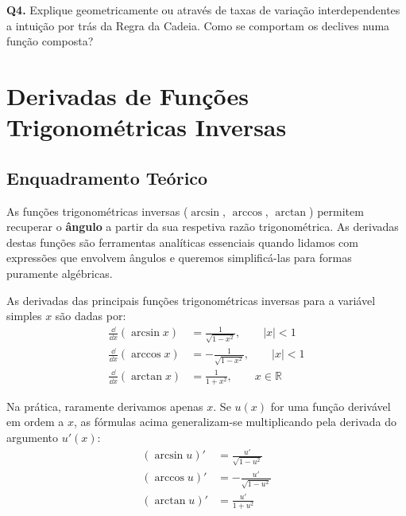 \begin{oralbox}
  \textbf{Q4.} Explique geometricamente ou através de taxas de variação interdependentes a intuição por trás da Regra da Cadeia. Como se comportam os declives numa função composta?
\end{oralbox}



\section{Derivadas de Funções Trigonométricas Inversas}

\subsection{Enquadramento Teórico}

\begin{notebox}[title={Intuição Essencial}]
  As funções trigonométricas inversas ($\arcsin$, $\arccos$, $\arctan$) permitem recuperar o \textbf{ângulo} a partir da sua respetiva razão trigonométrica. As derivadas destas funções são ferramentas analíticas essenciais quando lidamos com expressões que envolvem ângulos e queremos simplificá-las para formas puramente algébricas.
\end{notebox}

\begin{defbox}[title={Derivadas Fundamentais}]
  As derivadas das principais funções trigonométricas inversas para a variável simples $x$ são dadas por:
  \begin{align*}
      \frac{\dd}{\dd x} (\arcsin x) &= \frac{1}{\sqrt{1-x^2}}, \qquad |x| < 1 \\[1ex]
      \frac{\dd}{\dd x} (\arccos x) &= -\frac{1}{\sqrt{1-x^2}}, \qquad |x| < 1 \\[1ex]
      \frac{\dd}{\dd x} (\arctan x) &= \frac{1}{1+x^2}, \qquad x \in \mathbb{R}
  \end{align*}
\end{defbox}

\begin{defbox}[title={Generalização com a Regra da Cadeia}]
  Na prática, raramente derivamos apenas $x$. Se $u(x)$ for uma função derivável em ordem a $x$, as fórmulas acima generalizam-se multiplicando pela derivada do argumento $u'(x)$:
  \begin{align*}
      (\arcsin u)' &= \frac{u'}{\sqrt{1-u^2}} \\[1ex]
      (\arccos u)' &= -\frac{u'}{\sqrt{1-u^2}} \\[1ex]
      (\arctan u)' &= \frac{u'}{1+u^2}
  \end{align*}
\end{defbox}

